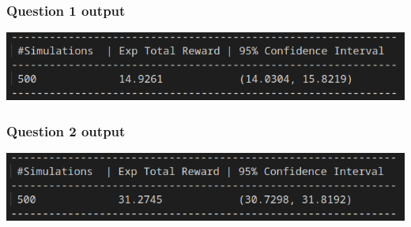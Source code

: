 \documentclass[12pt]{report}
\theoremstyle{definition}
\theoremstyle{plain}
\begin{document}
\subsubsection*{Question 1 output}
\includegraphics[width=\textwidth]{q1.png}
\subsubsection*{Question 2 output}
\includegraphics[width=\textwidth]{q2.png}
 \vspace{0.2cm} \\ \hline
\end{document}

